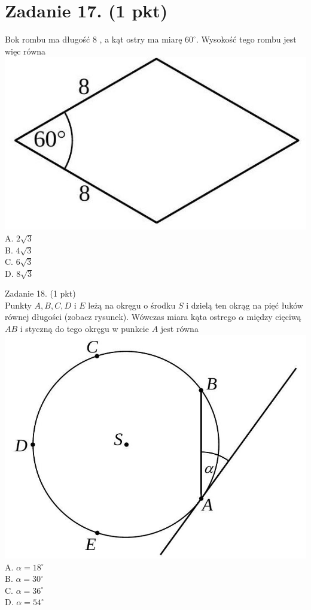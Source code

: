 \documentclass[10pt]{article}
\begin{document}
\section*{Zadanie 17. (1 pkt)}
Bok rombu ma długość 8 , a kąt ostry ma miarę \(60^{\circ}\). Wysokość tego rombu jest więc równa\\
\includegraphics[max width=\textwidth, center]{2024_11_21_2c2c97b7feae6d70b078g-06(1)}\\
A. \(2 \sqrt{3}\)\\
B. \(4 \sqrt{3}\)\\
C. \(6 \sqrt{3}\)\\
D. \(8 \sqrt{3}\)

Zadanie 18. (1 pkt)\\
Punkty \(A, B, C, D\) i \(E\) leżą na okręgu o środku \(S\) i dzielą ten okrąg na pięć łuków równej długości (zobacz rysunek). Wówczas miara kąta ostrego \(\alpha\) między cięciwą \(A B\) i styczną do tego okręgu w punkcie \(A\) jest równa\\
\includegraphics[max width=\textwidth, center]{2024_11_21_2c2c97b7feae6d70b078g-06}\\
A. \(\alpha=18^{\circ}\)\\
B. \(\alpha=30^{\circ}\)\\
C. \(\alpha=36^{\circ}\)\\
D. \(\alpha=54^{\circ}\)
\end{document}
